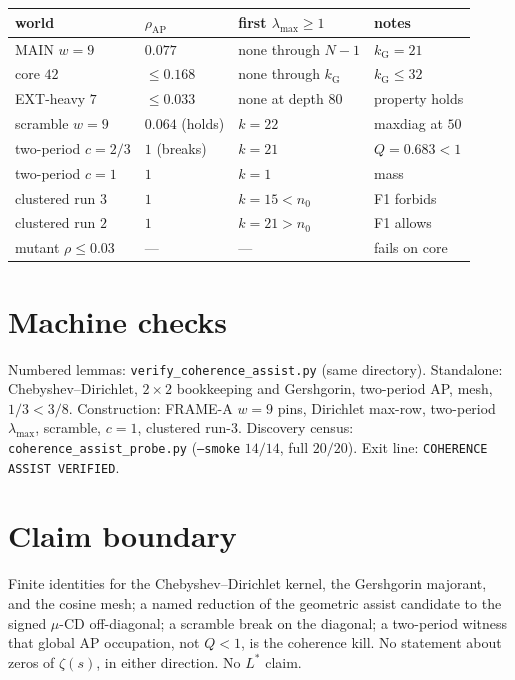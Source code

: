 \documentclass[11pt]{article}
\theoremstyle{remark}
\begin{document}
\begin{center}
\begin{tabular}{@{}llll@{}}
\toprule
world & $\rho_{\mathrm{AP}}$ & first $\lambda_{\max}\ge 1$ & notes\\
\midrule
MAIN $w=9$ & $0.077$ & none through $N-1$ & $k_{\mathrm{G}}=21$\\
core $42$ & $\le 0.168$ & none through $k_{\mathrm{G}}$ & $k_{\mathrm{G}}\le 32$\\
EXT-heavy $7$ & $\le 0.033$ & none at depth $80$ & property holds\\
scramble $w=9$ & $0.064$ (holds) & $k=22$ & maxdiag at $50$\\
two-period $c=2/3$ & $1$ (breaks) & $k=21$ & $Q=0.683<1$\\
two-period $c=1$ & $1$ & $k=1$ & mass\\
clustered run $3$ & $1$ & $k=15<n_0$ & F1 forbids\\
clustered run $2$ & $1$ & $k=21>n_0$ & F1 allows\\
mutant $\rho\le 0.03$ & --- & --- & fails on core\\
\bottomrule
\end{tabular}
\end{center}

\section{Machine checks}\label{sec:machine}

Numbered lemmas: \texttt{verify\_coherence\_assist.py}
(same directory).  Standalone: Chebyshev--Dirichlet, $2\times 2$
bookkeeping and Gershgorin, two-period AP, mesh, $1/3<3/8$.
Construction: FRAME-A $w=9$ pins, Dirichlet max-row, two-period
$\lambda_{\max}$, scramble, $c=1$, clustered run-$3$.
Discovery census: \texttt{coherence\_assist\_probe.py}
(\texttt{--smoke} $14/14$, full $20/20$).
Exit line: \texttt{COHERENCE ASSIST VERIFIED}.

\section*{Claim boundary}

Finite identities for the Chebyshev--Dirichlet kernel, the
Gershgorin majorant, and the cosine mesh; a named reduction of
the geometric assist candidate to the signed $\mu$-CD
off-diagonal; a scramble break on the diagonal; a two-period
witness that global AP occupation, not $Q<1$, is the coherence
kill.  No statement about zeros of $\zeta(s)$, in either
direction.  No $L^*$ claim.
\end{document}
